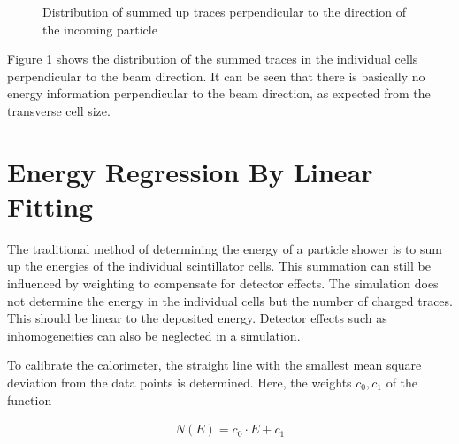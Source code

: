 \documentclass[12pt, a4paper]{thesis}
\begin{document}
\begin{figure}[hbtp]%
  \centering
  \qquad
  \caption{Distribution of summed up traces perpendicular to  the direction of the incoming particle}%
  \label{fig:y-distri}%
\end{figure}

Figure \ref{fig:y-distri} shows the distribution of the summed traces
in the individual cells perpendicular to the beam direction. It can be
seen that there is basically no energy information perpendicular to
the beam direction, as expected from the transverse cell size.

\section{Energy Regression By Linear Fitting}
\label{sec:orgd10286d}

The traditional method of determining the energy of a particle shower
is to sum up the energies of the individual scintillator cells. This
summation can still be influenced by weighting to compensate for
detector effects. The simulation does not determine the energy in the
individual cells but the number of charged traces. This should be
linear to the deposited energy. Detector effects such as
inhomogeneities can also be neglected in a simulation.

To calibrate the calorimeter, the straight line with the smallest mean
square deviation from the data points is determined. Here, the weights
\(c_0, c_1\) of the function

\begin{align}
  N(E) = c_0 \cdot E + c_1
\end{align}
\end{document}
